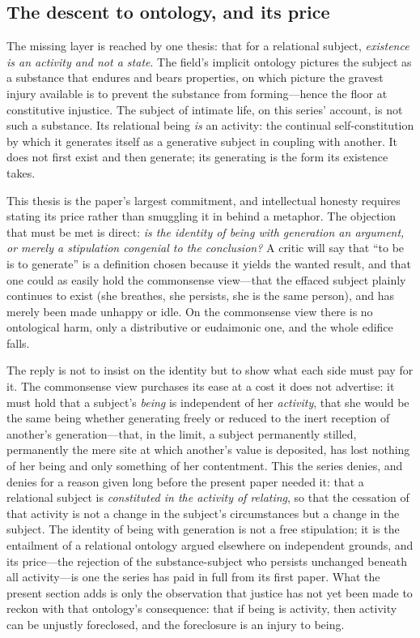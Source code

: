 \subsection{The descent to ontology, and its price}
\label{p18:sub:typ-descent}

The missing layer is reached by one thesis: that for a relational subject, \emph{existence is an activity and not a state}. The field's implicit ontology pictures the subject as a substance that endures and bears properties, on which picture the gravest injury available is to prevent the substance from forming---hence the floor at constitutive injustice. The subject of intimate life, on this series' account, is not such a substance. Its relational being \emph{is} an activity: the continual self-constitution by which it generates itself as a generative subject in coupling with another. It does not first exist and then generate; its generating is the form its existence takes.

This thesis is the paper's largest commitment, and intellectual honesty requires stating its price rather than smuggling it in behind a metaphor. The objection that must be met is direct: \emph{is the identity of being with generation an argument, or merely a stipulation congenial to the conclusion?} A critic will say that ``to be is to generate'' is a definition chosen because it yields the wanted result, and that one could as easily hold the commonsense view---that the effaced subject plainly continues to exist (she breathes, she persists, she is the same person), and has merely been made unhappy or idle. On the commonsense view there is no ontological harm, only a distributive or eudaimonic one, and the whole edifice falls.

The reply is not to insist on the identity but to show what each side must pay for it. The commonsense view purchases its ease at a cost it does not advertise: it must hold that a subject's \emph{being} is independent of her \emph{activity}, that she would be the same being whether generating freely or reduced to the inert reception of another's generation---that, in the limit, a subject permanently stilled, permanently the mere site at which another's value is deposited, has lost nothing of her being and only something of her contentment. This the series denies, and denies for a reason given long before the present paper needed it: that a relational subject is \emph{constituted in the activity of relating}, so that the cessation of that activity is not a change in the subject's circumstances but a change in the subject. The identity of being with generation is not a free stipulation; it is the entailment of a relational ontology argued elsewhere on independent grounds, and its price---the rejection of the substance-subject who persists unchanged beneath all activity---is one the series has paid in full from its first paper. What the present section adds is only the observation that justice has not yet been made to reckon with that ontology's consequence: that if being is activity, then activity can be unjustly foreclosed, and the foreclosure is an injury to being.

